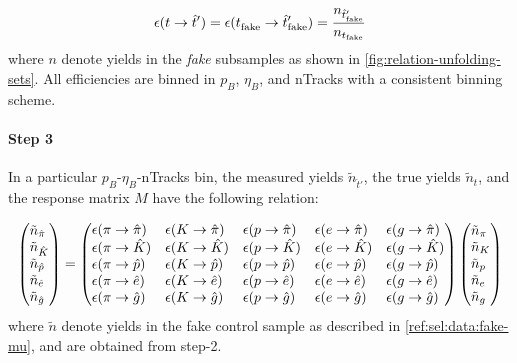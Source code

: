 \begin{equation}
    \misEff[t]{\hat{t}'} =
    \misEff[t^{\phantom{}}_\text{fake}]{\hat{t}'_\text{fake}} = \frac{n_{\hat{t}'_\text{fake}}}{n_{t_\text{fake}}}
\end{equation}
where $n$ denote yields in the \pidcalib \emph{fake} subsamples as shown
in \cref{fig:relation-unfolding-sets}.
All efficiencies are binned in $p_B$, $\eta_B$, and nTracks with a consistent
binning scheme.


\paragraph{Step 3}
In a particular $p_B$-$\eta_B$-nTracks bin,
the measured yields $\tilde{n}_{\hat{t}'}$,
the true yields $\tilde{n}_{t}$,
and the response matrix $M$ have the following relation:

\begin{equation}
    \begin{pmatrix*}[l]
        \tilde{n}_{\hat{\pi}} \\
        \tilde{n}_{\hat{K}}   \\
        \tilde{n}_{\hat{p}}   \\
        \tilde{n}_{\hat{e}}   \\
        \tilde{n}_{\hat{g}}   \\
    \end{pmatrix*}
    =
    \begin{pmatrix*}[l]
        \misEff[\pi]{\hat{\pi}} & \misEff[K]{\hat{\pi}} & \misEff[p]{\hat{\pi}} & \misEff[e]{\hat{\pi}} & \misEff[g]{\hat{\pi}} \\
        \misEff[\pi]{\hat{K}}   & \misEff[K]{\hat{K}}   & \misEff[p]{\hat{K}}   & \misEff[e]{\hat{K}}   & \misEff[g]{\hat{K}}   \\
        \misEff[\pi]{\hat{p}}   & \misEff[K]{\hat{p}}   & \misEff[p]{\hat{p}}   & \misEff[e]{\hat{p}}   & \misEff[g]{\hat{p}}   \\
        \misEff[\pi]{\hat{e}}   & \misEff[K]{\hat{e}}   & \misEff[p]{\hat{e}}   & \misEff[e]{\hat{e}}   & \misEff[g]{\hat{e}}   \\
        \misEff[\pi]{\hat{g}}   & \misEff[K]{\hat{g}}   & \misEff[p]{\hat{g}}   & \misEff[e]{\hat{g}}   & \misEff[g]{\hat{g}}   \\
    \end{pmatrix*}
    \begin{pmatrix*}[l]
        \tilde{n}_{{\pi}} \\
        \tilde{n}_{{K}}   \\
        \tilde{n}_{{p}}   \\
        \tilde{n}_{{e}}   \\
        \tilde{n}_{{g}}   \\
    \end{pmatrix*}
\end{equation}
where $\tilde{n}$ denote yields in the fake \muon control sample
as described in \cref{ref:sel:data:fake-mu},
and  are obtained from step-2.

